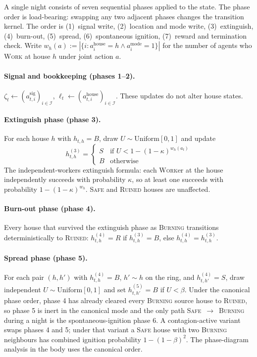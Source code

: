 \documentclass{anvil-paper}
\begin{document}
A single night consists of seven sequential phases applied to the state.
The phase order is load-bearing: swapping any two adjacent phases changes
the transition kernel. The order is (1)~signal write, (2)~location and
mode write, (3)~extinguish, (4)~burn-out, (5)~spread, (6)~spontaneous
ignition, (7)~reward and termination check. Write
$w_h(a):=|\{i:a_i^{\text{house}}=h\land a_i^{\text{mode}}=1\}|$ for the
number of agents who \textsc{Work} at house $h$ under joint action $a$.

\paragraph{Signal and bookkeeping (phases 1--2).}
$\zeta_t\leftarrow(a_{t,i}^{\text{sig}})_{i\in\mathcal{I}}$,
$\ell_t\leftarrow(a_{t,i}^{\text{house}})_{i\in\mathcal{I}}$. These
updates do not alter house states.

\paragraph{Extinguish phase (phase 3).}
For each house $h$ with $h_{t,h}=B$, draw $U\sim\mathrm{Uniform}[0,1]$
and update
\[
  h_{t,h}^{(3)} = \begin{cases}
    S & \text{if } U < 1-(1-\kappa)^{w_h(a_t)} \\
    B & \text{otherwise}
  \end{cases}
\]
The independent-workers extinguish formula: each \textsc{Work}er at the
house independently succeeds with probability $\kappa$, so at least one
succeeds with probability $1-(1-\kappa)^{w_h}$. \textsc{Safe} and
\textsc{Ruined} houses are unaffected.

\paragraph{Burn-out phase (phase 4).}
Every house that survived the extinguish phase as \textsc{Burning}
transitions deterministically to \textsc{Ruined}:
$h_{t,h}^{(4)}=R$ if $h_{t,h}^{(3)}=B$, else $h_{t,h}^{(4)}=h_{t,h}^{(3)}$.

\paragraph{Spread phase (phase 5).}
For each pair $(h,h')$ with $h_{t,h}^{(4)}=B$, $h'\sim h$ on the ring,
and $h_{t,h'}^{(4)}=S$, draw independent $U\sim\mathrm{Uniform}[0,1]$
and set $h_{t,h'}^{(5)}=B$ if $U<\beta$. Under the canonical phase
order, phase 4 has already cleared every \textsc{Burning} source house
to \textsc{Ruined}, so phase 5 is inert in the canonical mode and the
only path \textsc{Safe}~$\to$~\textsc{Burning} during a night is the
spontaneous-ignition phase 6. A contagion-active variant swaps phases 4
and 5; under that variant a \textsc{Safe} house with two \textsc{Burning}
neighbours has combined ignition probability $1-(1-\beta)^2$. The
phase-diagram analysis in the body uses the canonical order.
\end{document}
